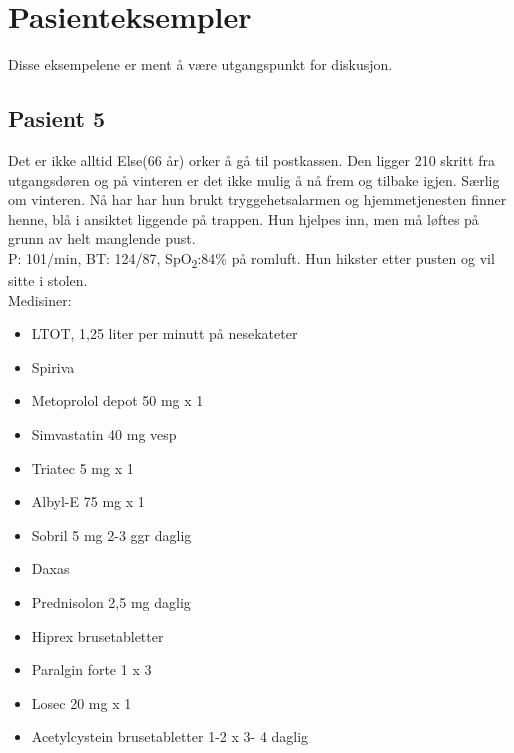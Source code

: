 		\section{Pasienteksempler}
			Disse eksempelene er ment å være utgangspunkt for diskusjon.
			\subsection{Pasient 5}
				Det er ikke alltid Else(66 år) orker å gå til postkassen. Den ligger 210 skritt fra utgangsdøren og på vinteren er det ikke mulig å nå frem og tilbake igjen. Særlig om vinteren. Nå har har hun brukt tryggehetsalarmen og hjemmetjenesten finner henne, blå i ansiktet liggende på trappen. Hun hjelpes inn, men må løftes på grunn av helt manglende pust.\\
				P: 101/min, BT: 124/87, SpO\textsubscript{2}:84\% på romluft. Hun hikster etter pusten og vil sitte i stolen. \\
				Medisiner:
						\begin{itemize}
							\item LTOT, 1,25 liter per minutt på nesekateter\\
							\item Spiriva\textregistered \\
							\item Metoprolol depot 50 mg x 1\\
							\item Simvastatin 40 mg vesp \\
							\item Triatec 5 mg x 1 \\
							\item Albyl-E 75 mg x 1\\
							\item Sobril 5 mg 2-3 ggr daglig\\
							\item Daxas \textregistered \\
							\item Prednisolon 2,5 mg daglig\\
							\item Hiprex brusetabletter\\
							\item Paralgin forte 1 x 3\\
							\item Losec 20 mg x 1\\
							\item Acetylcystein brusetabletter 1-2 x 3- 4 daglig\\
						\end{itemize}

